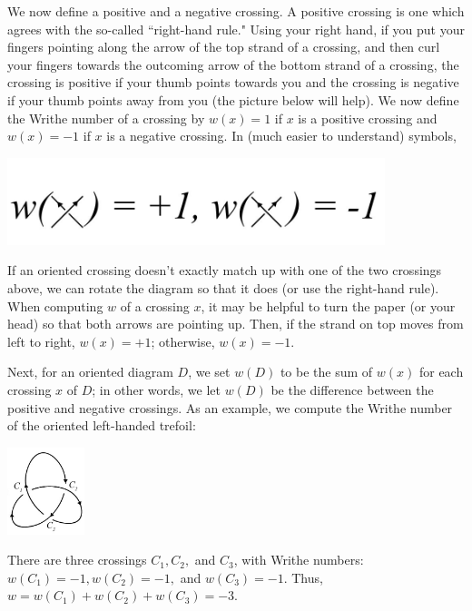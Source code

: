 \documentclass[12 pt]{article}
\begin{document}
We now define a positive and a negative crossing. A positive crossing is one which agrees with the so-called ``right-hand rule." Using your right hand, if you put your fingers pointing along the arrow of the top strand of a crossing, and then curl your fingers towards the outcoming arrow of the bottom strand of a crossing, the crossing is positive if your thumb points towards you and the crossing is negative if your thumb points away from you (the picture below will help). We now define the Writhe number of a crossing by $w(x)=1$ if $x$ is a positive crossing and $w(x)=-1$ if $x$ is a negative crossing. In (much easier to understand) symbols,\\
\begin{center}
\includegraphics[height=1in]{writhe_definition.jpg}
\end{center}

If an oriented crossing doesn't exactly match up with one of the two crossings above, we can rotate the diagram so that it does (or use the right-hand rule). When computing $w$ of a crossing $x$, it may be helpful to turn the paper (or your head) so that both arrows are pointing up. Then, if the strand on top moves from left to right, $w(x)=+1$; otherwise, $w(x)=-1$.

Next, for an oriented diagram $D$, we set $w(D)$ to be the sum of $w(x)$ for each crossing $x$ of $D$; in other words, we let $w(D)$ be the difference between the positive and negative crossings. As an example, we compute the Writhe number of the oriented left-handed trefoil:\\
\begin{center}
\includegraphics[height=1in]{trefoil_writhe_example.jpg}
\end{center}

There are three crossings $C_1, C_2,$ and $C_3$, with Writhe numbers: $w(C_1) =-1, w(C_2) = -1,$ and $w(C_3) = -1$. Thus, $w = w(C_1) + w(C_2) + w(C_3) = -3$.
\end{document}
